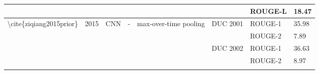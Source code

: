 \begin{table}[]
\begin{tabular}{|c|c|c|c|c|c|cc|}
    \multicolumn{1}{|l|}{}                                                                & \multicolumn{1}{l|}{}                      & \multicolumn{1}{l|}{}                             & \multicolumn{1}{l|}{}                                     & \multicolumn{1}{l|}{}                                                                                                  & \multicolumn{1}{l|}{}                                 & \multicolumn{1}{l|}{ROUGE-L}                                                                                                       & \multicolumn{1}{l|}{18.47} \\ \hline
    \multicolumn{1}{|l|}{\multirow{6}{*}{\textbackslash{}cite\{ziqiang2015prior\}}}       & \multicolumn{1}{l|}{\multirow{6}{*}{2015}} & \multicolumn{1}{l|}{\multirow{6}{*}{CNN}}         & \multicolumn{1}{l|}{\multirow{6}{*}{-}}                   & \multicolumn{1}{l|}{\multirow{6}{*}{max-over-time pooling}}                                                            & \multicolumn{1}{l|}{\multirow{2}{*}{DUC 2001}}        & \multicolumn{1}{l|}{ROUGE-1}                                                                                                       & \multicolumn{1}{l|}{35.98} \\ \cline{7-8} 
    \multicolumn{1}{|l|}{}                                                                & \multicolumn{1}{l|}{}                      & \multicolumn{1}{l|}{}                             & \multicolumn{1}{l|}{}                                     & \multicolumn{1}{l|}{}                                                                                                  & \multicolumn{1}{l|}{}                                 & \multicolumn{1}{l|}{ROUGE-2}                                                                                                       & \multicolumn{1}{l|}{7.89}  \\ \cline{6-8} 
    \multicolumn{1}{|l|}{}                                                                & \multicolumn{1}{l|}{}                      & \multicolumn{1}{l|}{}                             & \multicolumn{1}{l|}{}                                     & \multicolumn{1}{l|}{}                                                                                                  & \multicolumn{1}{l|}{\multirow{2}{*}{DUC 2002}}        & \multicolumn{1}{l|}{ROUGE-1}                                                                                                       & \multicolumn{1}{l|}{36.63} \\ \cline{7-8} 
    \multicolumn{1}{|l|}{}                                                                & \multicolumn{1}{l|}{}                      & \multicolumn{1}{l|}{}                             & \multicolumn{1}{l|}{}                                     & \multicolumn{1}{l|}{}                                                                                                  & \multicolumn{1}{l|}{}                                 & \multicolumn{1}{l|}{ROUGE-2}                                                                                                       & \multicolumn{1}{l|}{8.97}  \\ \cline{6-8} 

\end{tabular}
\end{table}
